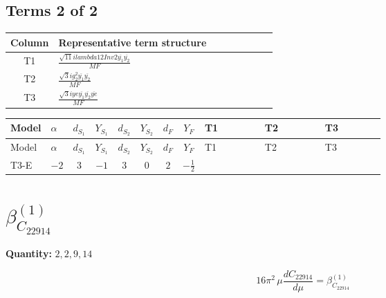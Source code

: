 \documentclass[8pt]{article}
\begin{document}
\begin{landscape}
\subsection*{Terms 2 of 2}
\begin{center}
\begin{tabular}{@{}c >{\raggedright\arraybackslash}p{0.82\linewidth}@{}}
\toprule
Column & Representative term structure \\
\midrule
T1 & \(\displaystyle \frac{\sqrt{11} i lambda12Inv2 \overline{y_{1}} \overline{y_{2}}}{MF}\) \\
\midrule
T2 & \(\displaystyle \frac{\sqrt{3} i g_{2}^{2} \overline{y_{1}} \overline{y_{2}}}{MF}\) \\
\midrule
T3 & \(\displaystyle \frac{\sqrt{3} i ye \overline{y_{1}} \overline{y_{2}} \overline{ye}}{MF}\) \\
\midrule
\bottomrule
\end{tabular}
\end{center}
\smallskip
\tiny
\begin{longtable}{@{}llcccccc >{\raggedright\arraybackslash}p{0.21\linewidth} >{\raggedright\arraybackslash}p{0.21\linewidth} >{\raggedright\arraybackslash}p{0.21\linewidth}@{}}
\toprule
Model & $\alpha$ & $d_{S_1}$ & $Y_{S_1}$ & $d_{S_2}$ & $Y_{S_2}$ & $d_F$ & $Y_F$ & T1 & T2 & T3 \\
\midrule
\endfirsthead
\toprule
Model & $\alpha$ & $d_{S_1}$ & $Y_{S_1}$ & $d_{S_2}$ & $Y_{S_2}$ & $d_F$ & $Y_F$ & T1 & T2 & T3 \\
\midrule
\endhead
T3-E & $-2$ & $3$ & $-1$ & $3$ & $0$ & $2$ & $-\frac{1}{2}$ & \scriptsize\adjustbox{max width=\linewidth}{$\begin{gathered} \frac{3 \sqrt{11} i lambda12Inv2 \overline{y_{1}} \overline{y_{2}}}{22 MF}\end{gathered}$} & \scriptsize\adjustbox{max width=\linewidth}{$\begin{gathered} \frac{11 \sqrt{3} i g_{2}^{2} \overline{y_{1}} \overline{y_{2}}}{8 MF}\end{gathered}$} & \scriptsize\adjustbox{max width=\linewidth}{$\begin{gathered} - \frac{\sqrt{3} i ye \overline{y_{1}} \overline{y_{2}} \overline{ye}}{12 MF}\end{gathered}$} \\
\midrule
\bottomrule
\end{longtable}
\clearpage
\section*{$\beta_{C_{22914}}^{(1)}$}
\noindent\textbf{Quantity: }$\mathrm{2,2,9,14}$\par\smallskip
\[16\pi^2\,\mu\frac{d C_{22914}}{d\mu}=\beta_{C_{22914}}^{(1)}\]

\end{landscape}
\end{document}
